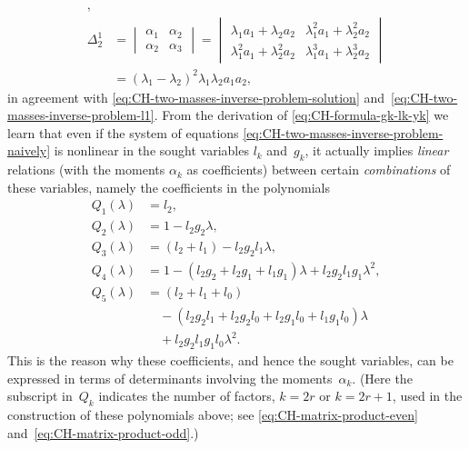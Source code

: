 \documentclass[10pt,a4paper]{article} \pdfoutput=1 
\begin{document}
\begin{example}
\begin{equation}
\begin{aligned}
      ,\\
      \Delta_2^1 & =
      \begin{vmatrix} \alpha_1 & \alpha_2 \\ \alpha_2 & \alpha_3 \end{vmatrix}
      = \begin{vmatrix}
        \lambda_1 a_1 + \lambda_2 a_2 & \lambda_1^2 a_1 + \lambda_2^2 a_2 \\
        \lambda_1^2 a_1 + \lambda_2^2 a_2 & \lambda_1^3 a_1 + \lambda_2^3 a_2
      \end{vmatrix}
      \\ &
      = (\lambda_1 - \lambda_2)^2 \lambda_1 \lambda_2 a_1 a_2
      ,
    \end{aligned}
  \end{equation}
  in agreement with \eqref{eq:CH-two-masses-inverse-problem-solution}
  and~\eqref{eq:CH-two-masses-inverse-problem-l1}.
  From the derivation of \eqref{eq:CH-formula-gk-lk-yk}
  we learn that even if the system
  of equations \eqref{eq:CH-two-masses-inverse-problem-naively}
  is nonlinear in the sought variables $l_k$ and~$g_k$,
  it actually implies \emph{linear} relations (with the moments $\alpha_k$ as coefficients)
  between certain \emph{combinations} of these variables, namely the coefficients in the polynomials
  \begin{equation*}
    \begin{aligned}
      Q_1(\lambda) &= l_2
      ,\\
      Q_2(\lambda) &= 1 - l_2 g_2 \lambda
      ,\\
      Q_3(\lambda) &= (l_2+l_1) - l_2 g_2 l_1 \lambda
      ,\\
      Q_4(\lambda) &= 1 - (l_2 g_2 + l_2 g_1 + l_1 g_1) \lambda + l_2 g_2 l_1 g_1 \lambda^2
      ,\\
      Q_5(\lambda) &= (l_2+l_1+l_0)
      \\ & \quad
      - (l_2 g_2 l_1 + l_2 g_2 l_0 + l_2 g_1 l_0 + l_1 g_1 l_0) \lambda
      \\ & \quad
      + l_2 g_2 l_1 g_1 l_0 \lambda^2
      .
    \end{aligned}
  \end{equation*}
  This is the reason why these coefficients, and hence the sought variables,
  can be expressed in terms of determinants involving the moments~$\alpha_k$.
  (Here the subscript in~$Q_k$ indicates the number of factors, $k=2r$ or $k=2r+1$,
  used in the construction of these polynomials above;
  see \eqref{eq:CH-matrix-product-even} and~\eqref{eq:CH-matrix-product-odd}.)
\end{example}
\end{document}
